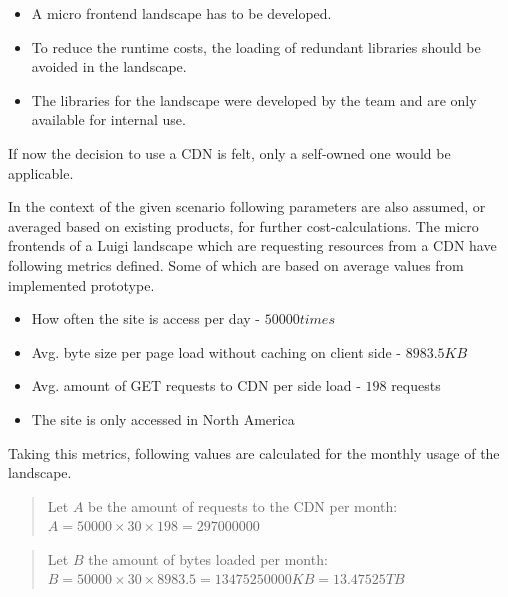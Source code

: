 \begin{itemize}[noitemsep]
	\item A micro frontend landscape has to be developed. 
	\item To reduce the runtime costs, the loading of redundant libraries should be avoided in the landscape.
	\item The libraries for the landscape were developed by the team and are only available for internal use.
\end{itemize} 

If now the decision to use a CDN is felt, only a self-owned one would be applicable.

In the context of the given scenario following parameters are also assumed, or averaged based on existing products, for further cost-calculations.
The micro frontends of a Luigi landscape which are requesting resources from a CDN have following metrics defined. Some of which are based on average values from implemented prototype.

\begin{itemize}[noitemsep]
	\item How often the site is access per day - $50 000 times$
	\item Avg. byte size per page load without caching on client side - $8983.5 KB$
	\item Avg. amount of GET requests to CDN per side load - $198$ requests 
	\item The site is only accessed in North America 
\end{itemize} 

Taking this metrics, following values are calculated for the monthly usage of the landscape.

\begin{quote}
	\begin{center}
		Let $A$ be the amount of requests to the CDN per month:
		\begin{math}
			A = 50000 \times 30 \times 198 = 297000000
		\end{math}
	\end{center} 
\end{quote}

\begin{quote}
	\begin{center}
		Let $B$ the amount of bytes loaded per month:
		\begin{math}
			B = 50000 \times 30 \times 8983.5 = 13475250000 KB = 13.47525 TB
		\end{math}
	\end{center} 
\end{quote}

